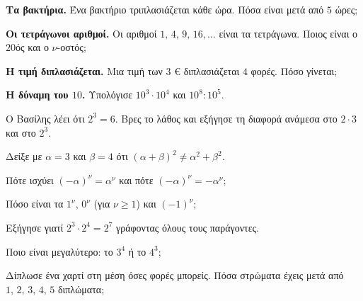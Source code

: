 \ex \textbf{Τα βακτήρια.} Ένα βακτήριο τριπλασιάζεται κάθε ώρα. Πόσα είναι μετά από $5$ ώρες;

\ex \textbf{Οι τετράγωνοι αριθμοί.} Οι αριθμοί $1,\,4,\,9,\,16,\dots$ είναι τα τετράγωνα. Ποιος είναι ο $20$ός και ο $\nu$-οστός;

\ex \textbf{Η τιμή διπλασιάζεται.} Μια τιμή των $3$ € διπλασιάζεται $4$ φορές. Πόσο γίνεται;

\ex \textbf{Η δύναμη του $10$.} Υπολόγισε $10^3\cdot10^4$ και $10^8:10^5$.


\ex Ο Βασίλης λέει ότι $2^3=6$. Βρες το λάθος και εξήγησε τη διαφορά ανάμεσα στο $2\cdot3$ και στο $2^3$.

\ex Δείξε με $\alpha=3$ και $\beta=4$ ότι $(\alpha+\beta)^2\neq\alpha^2+\beta^2$.

\ex Πότε ισχύει $(-\alpha)^\nu=\alpha^\nu$ και πότε $(-\alpha)^\nu=-\alpha^\nu$;

\ex Πόσο είναι τα $1^\nu$, $0^\nu$ (για $\nu\ge1$) και $(-1)^\nu$;

\ex Εξήγησε γιατί $2^3\cdot2^4=2^7$ γράφοντας όλους τους παράγοντες.

\ex Ποιο είναι μεγαλύτερο: το $3^4$ ή το $4^3$;


\ex Δίπλωσε ένα χαρτί στη μέση όσες φορές μπορείς. Πόσα στρώματα έχεις μετά από $1,\,2,\,3,\,4,\,5$ διπλώματα;
